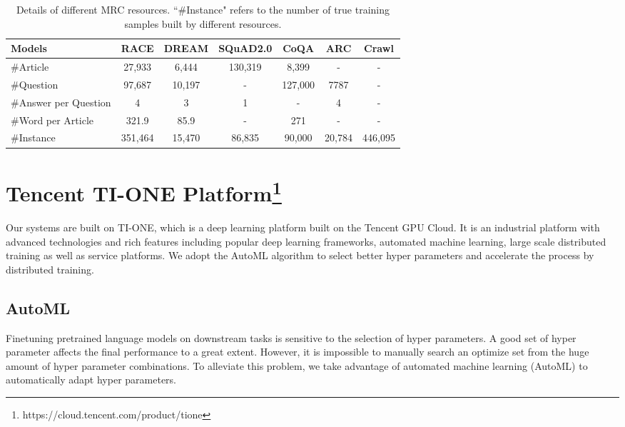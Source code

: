 \documentclass[11pt,a4paper]{article}
\begin{document}
\begin{table*}[t]
\centering
    \begin{tabular}{lcccccc}
    \hline 
        Models & RACE & DREAM & SQuAD2.0 & CoQA & ARC & Crawl \\ \hline
        \#Article  & 27,933 & 6,444 & 130,319 & 8,399 & - &  - \\
        \#Question  & 97,687 & 10,197 & - & 127,000 & 7787 &  -  \\
        \#Answer per Question  & 4 & 3 & 1 & - & 4 &  -  \\
        \#Word per Article & 321.9 & 85.9 & - & 271 & - &  -  \\
        \#Instance  & 351,464 & 15,470 & 86,835 & 90,000 & 20,784 &  446,095  \\
        \hline
    \end{tabular}
    \caption{Details of different MRC resources. ``\#Instance" refers to the number of true training samples built by different resources.}
    \label{tab:data}
\end{table*}
 
\section{Tencent TI-ONE Platform\footnote{https://cloud.tencent.com/product/tione}}

Our systems are built on TI-ONE, which is a deep learning platform built on the Tencent GPU Cloud. It is an industrial platform with advanced technologies and rich features including  popular deep learning frameworks, automated machine learning, large scale distributed training as well as service platforms. 
We adopt the AutoML algorithm to select better hyper parameters and accelerate the process by distributed training.

\subsection{AutoML}

Finetuning pretrained language models on downstream tasks is sensitive to the selection of hyper parameters. A good set of hyper parameter affects the final performance to a great extent. However, it is impossible to manually search an optimize set from the huge amount of hyper parameter combinations. To alleviate this problem, we take advantage of automated machine learning (AutoML)\cite{he2019automl,zoller2019survey,elshawi2019automated} to automatically adapt hyper parameters. 
\end{document}
